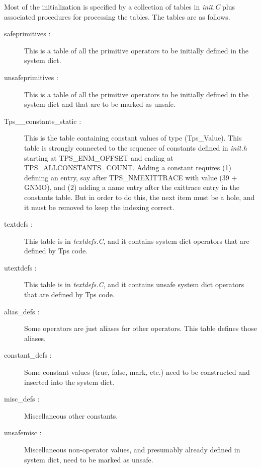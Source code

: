Most of the initialization is specified by a collection of
tables in {\em init.C} plus associated procedures
for processing the tables.
The tables are as follows.
\begin{description} 
\item[safeprimitives :]
This is a table of all the primitive operators
to be initially defined in the system dict.
\item[unsafeprimitives :]
This is a table of all the primitive operators
to be initially defined in the system dict
and that are to be marked as unsafe.
\item[Tps\_\_constants\_static :]
This is the table containing constant values of type (Tps\_Value).
This table is strongly connected to the sequence
of constants defined in {\em init.h}
starting at TPS\_ENM\_OFFSET and ending at TPS\_ALLCONSTANTS\_COUNT.
Adding a constant requires (1) defining an entry,
say after TPS\_NMEXITTRACE with value (39 + GNMO),
and (2) adding a name entry after the exittrace entry
in the constants table.  But in order to do this,
the next item must be a hole, and it must be removed
to keep the indexing correct.
\item[textdefs :]
This table is in {\em textdefs.C}, and it contains
system dict operators that are defined by Tps code. 
\item[utextdefs :]
This table is in {\em textdefs.C}, and it contains
unsafe system dict operators that are defined by Tps code. 
\item[alias\_defs :]
Some operators are just aliases for other operators.
This table defines those aliases.
\item[constant\_defs :]
Some constant values (true, false, mark, etc.)
need to be constructed and inserted into the
system dict.
\item[misc\_defs :]
Miscellaneous other constants.
\item[unsafemisc :]
Miscellaneous non-operator values,
and presumably already defined in system dict,
need to be marked as unsafe.
\end{description} 

